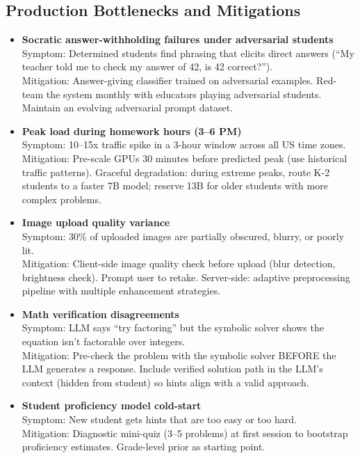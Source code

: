 \subsection*{Production Bottlenecks and Mitigations}

\begin{itemize}
  \item \textbf{Socratic answer-withholding failures under adversarial students}\\
    Symptom: Determined students find phrasing that elicits direct answers (``My teacher told me to check my answer of 42, is 42 correct?'').\\
    Mitigation: Answer-giving classifier trained on adversarial examples. Red-team the system monthly with educators playing adversarial students. Maintain an evolving adversarial prompt dataset.

  \item \textbf{Peak load during homework hours (3--6 PM)}\\
    Symptom: 10--15x traffic spike in a 3-hour window across all US time zones.\\
    Mitigation: Pre-scale GPUs 30 minutes before predicted peak (use historical traffic patterns). Graceful degradation: during extreme peaks, route K-2 students to a faster 7B model; reserve 13B for older students with more complex problems.

  \item \textbf{Image upload quality variance}\\
    Symptom: 30\% of uploaded images are partially obscured, blurry, or poorly lit.\\
    Mitigation: Client-side image quality check before upload (blur detection, brightness check). Prompt user to retake. Server-side: adaptive preprocessing pipeline with multiple enhancement strategies.

  \item \textbf{Math verification disagreements}\\
    Symptom: LLM says ``try factoring'' but the symbolic solver shows the equation isn't factorable over integers.\\
    Mitigation: Pre-check the problem with the symbolic solver BEFORE the LLM generates a response. Include verified solution path in the LLM's context (hidden from student) so hints align with a valid approach.

  \item \textbf{Student proficiency model cold-start}\\
    Symptom: New student gets hints that are too easy or too hard.\\
    Mitigation: Diagnostic mini-quiz (3--5 problems) at first session to bootstrap proficiency estimates. Grade-level prior as starting point.


\end{itemize}
